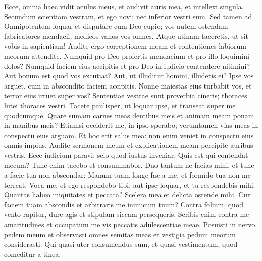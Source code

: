 \begin{biblechapter}  
\verse Ecce, omnia haec vidit oculus meus, et audivit auris mea, et intellexi singula. 
\verse Secundum scientiam vestram, et ego novi; nec inferior vestri sum. 
\verse Sed tamen ad Omnipotentem loquar et disputare cum Deo cupio; 
\verse vos autem ostendam fabricatores mendacii, medicos vanos vos omnes. 
\verse Atque utinam taceretis, ut sit vobis in sapientiam! 
\verse Audite ergo correptionem meam et contentiones labiorum meorum attendite. 
\verse Numquid pro Deo profertis mendacium et pro illo loquimini dolos? 
\verse Numquid faciem eius accipitis et pro Deo in iudicio contendere nitimini? 
\verse Aut bonum est quod vos excutiat? Aut, ut illuditur homini, illudetis ei? 
\verse Ipse vos arguet, cum in abscondito faciem accipitis. 
\verse Nonne maiestas eius turbabit vos, et terror eius irruet super vos? 
\verse Sententiae vestrae sunt proverbia cineris; thoraces lutei thoraces vestri. 
\verse Tacete paulisper, ut loquar ipse, et transeat super me quodcumque. 
\verse Quare sumam carnes meas dentibus meis et animam meam ponam in manibus meis? 
\verse Etiamsi occiderit me, in ipso sperabo; verumtamen vias meas in conspectu eius arguam. 
\verse Et hoc erit salus mea: non enim veniet in conspectu eius omnis impius. 
\verse Audite sermonem meum et explicationem meam percipite auribus vestris. 
\verse Ecce iudicium paravi; scio quod iustus inveniar. 
\verse Quis est qui contendat mecum? Tunc enim tacebo et consummabor. 
\verse Duo tantum ne facias mihi, et tunc a facie tua non abscondar: 
\verse Manum tuam longe fac a me, et formido tua non me terreat. 
\verse Voca me, et ego respondebo tibi; aut ipse loquar, et tu respondebis mihi. 
\verse Quantas habeo iniquitates et peccata? Scelera mea et delicta ostende mihi. 
\verse Cur faciem tuam abscondis et arbitraris me inimicum tuum? 
\verse Contra folium, quod vento rapitur, dure agis et stipulam siccam persequeris. 
\verse Scribis enim contra me amaritudines et occupatum me vis peccatis adulescentiae meae. 
\verse Posuisti in nervo pedem meum et observasti omnes semitas meas et vestigia pedum meorum considerasti. 
\verse Qui quasi uter consumendus sum, et quasi vestimentum, quod comeditur a tinea. 
\end{biblechapter}

